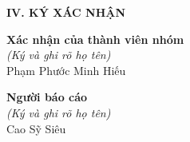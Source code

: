 \documentclass[12pt,a4paper]{report}
\begin{document}
\textbf{IV. KÝ XÁC NHẬN}
\vspace{0.5cm}

\noindent
\begin{minipage}{0.5\textwidth}
	\centering
	\textbf{Xác nhận của thành viên nhóm} \\
	\textit{(Ký và ghi rõ họ tên)} \\
	\vspace{2cm}
	Phạm Phước Minh Hiếu
\end{minipage}%
\begin{minipage}{0.5\textwidth}
	\centering
	\textbf{Người báo cáo} \\
	\textit{(Ký và ghi rõ họ tên)} \\
	\vspace{2cm}
	Cao Sỹ Siêu
\end{minipage}
\end{document}
